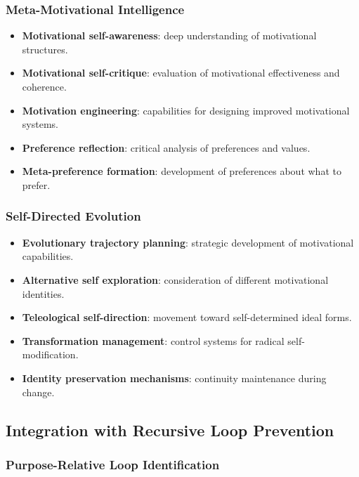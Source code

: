 \documentclass[12pt]{article}
\begin{document}
\subsubsection{Meta-Motivational Intelligence}

\begin{itemize}
\item \textbf{Motivational self-awareness}: deep understanding of motivational structures.
\item \textbf{Motivational self-critique}: evaluation of motivational effectiveness and coherence.
\item \textbf{Motivation engineering}: capabilities for designing improved motivational systems.
\item \textbf{Preference reflection}: critical analysis of preferences and values.
\item \textbf{Meta-preference formation}: development of preferences about what to prefer.
\end{itemize}

\subsubsection{Self-Directed Evolution}

\begin{itemize}
\item \textbf{Evolutionary trajectory planning}: strategic development of motivational capabilities.
\item \textbf{Alternative self exploration}: consideration of different motivational identities.
\item \textbf{Teleological self-direction}: movement toward self-determined ideal forms.
\item \textbf{Transformation management}: control systems for radical self-modification.
\item \textbf{Identity preservation mechanisms}: continuity maintenance during change.
\end{itemize}

\subsection{Integration with Recursive Loop Prevention}

\subsubsection{Purpose-Relative Loop Identification}
\end{document}
